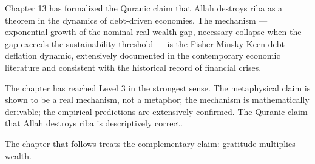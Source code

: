 Chapter 13 has formalized the Quranic claim that Allah destroys
riba as a theorem in the dynamics of debt-driven economies. The
mechanism --- exponential growth of the nominal-real wealth gap,
necessary collapse when the gap exceeds the sustainability
threshold --- is the Fisher-Minsky-Keen debt-deflation dynamic,
extensively documented in the contemporary economic literature
and consistent with the historical record of financial crises.

The chapter has reached Level 3 in the strongest sense. The
metaphysical claim is shown to be a real mechanism, not a
metaphor; the mechanism is mathematically derivable; the empirical
predictions are extensively confirmed. The Quranic claim that
Allah destroys riba is descriptively correct.

The chapter that follows treats the complementary claim:
gratitude multiplies wealth.

